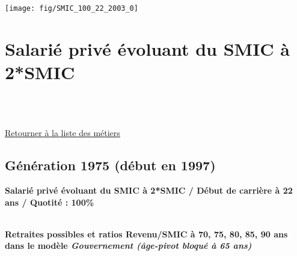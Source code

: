  \vspace{0.1cm} 

 {\hspace{-2.2cm}\texttt{[image: fig/SMIC\_100\_22\_2003\_0]}} 

\newpage 
 
\chapter{Salarié privé évoluant du SMIC à 2*SMIC} 

~\\ 
 


   
 \localtableofcontents 

~\\ 
 
 \hyperlink{page.2}{\noindent Retourner à la liste des métiers}

 \newpage 

\section{Génération 1975 (début en 1997)\label{Ascendant12_100_22_1975_0}} 
 
{\bf \noindent Salarié privé évoluant du SMIC à 2*SMIC / Début de carrière à 22 ans / Quotité : 100\%}  ~ 

 ~\\{\bf \noindent Retraites possibles et ratios Revenu/SMIC à 70, 75, 80, 85, 90 ans dans le modèle \emph{Gouvernement (âge-pivot bloqué à 65 ans)}}  
 
